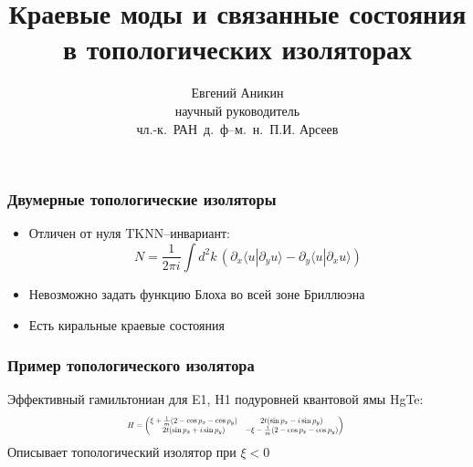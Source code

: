 \documentclass{beamer}
\title{Краевые моды и связанные состояния в топологических изоляторах}
\author[Е. Аникин]{Евгений Аникин \\
	научный руководитель\\
	чл.-к.~РАН~д.~ф--м.~н.~П.И. Арсеев}
\institute{ФИАН им. Лебедева}
\date{}
\begin{document}
\begin{frame}
    \titlepage
\end{frame}

\begin{frame}
    \frametitle{Двумерные топологические изоляторы}
    \begin{itemize}
        \item Отличен от нуля $\mathrm{TKNN}$--инвариант:
            \begin{equation}
                \label{TKNN}
                N = \frac{1}{2\pi i} 
                    \int d^2 k\, \left(\partial_x \langle u | \partial_y u \rangle -
                    \partial_y \langle u | \partial_x u \rangle \right)
            \end{equation}
        \item Невозможно задать функцию Блоха во всей зоне Бриллюэна
        \item Есть киральные краевые состояния
    \end{itemize}
\end{frame}

\begin{frame}
    \frametitle{Пример топологического изолятора}
        Эффективный гамильтониан для E1, H1 подуровней квантовой ямы HgTe:
        \begin{equation}
           \label{eff_so_ham}
            \scalebox{0.6}{%
            $
            H = \left(\begin{matrix}
                    \xi + \frac{1}{m}(2 - \cos{p_x} - \cos{p_y}) & 
                            2t(\sin{p_x} - i\sin{p_y})   \\
                    2t(\sin{p_x} + i\sin{p_y}) & 
                           - \xi - \frac{1}{m}(2 - \cos{p_x} - \cos{p_y}) \\
                \end{matrix}\right)
            $
            }
        \end{equation}
        Описывает топологический изолятор при $\xi < 0$
\end{frame}
\end{document}
